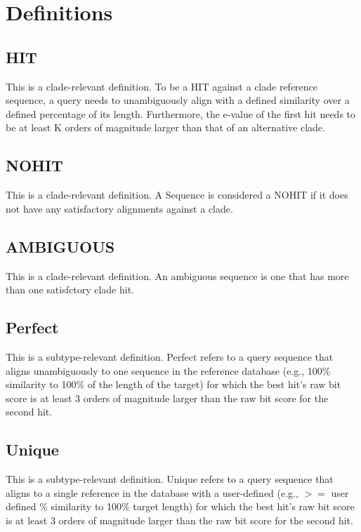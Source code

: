 \documentclass[letterpaper,10pt,english]{sphinxmanual}
\begin{document}
\section{Definitions}
\label{defs:definitions}

\subsection{HIT}
\label{defs:hits}\label{defs:hit}
This is a clade-relevant definition. To be a HIT against a clade reference sequence, a query needs to unambiguously align with a defined similarity over a defined percentage of its length.
Furthermore, the e-value of the first hit needs to be at least K orders of magnitude larger than that of an alternative clade.


\subsection{NOHIT}
\label{defs:nohits}\label{defs:nohit}
This is a clade-relevant definition. A Sequence is considered a NOHIT if it does not have any satisfactory alignments against a clade.


\subsection{AMBIGUOUS}
\label{defs:ambiguous}\label{defs:id1}
This is a clade-relevant definition. An ambiguous sequence is one that has more than one satisfctory clade hit.


\subsection{Perfect}
\label{defs:perfect}\label{defs:id2}
This is a subtype-relevant definition. Perfect refers to a query
sequence that aligns unambiguously to one sequence in the reference
database (e.g., 100\% similarity to 100\% of the length of the target)
for which the best hit's raw bit score is at least 3 orders of
magnitude larger than the raw bit score for the second hit.


\subsection{Unique}
\label{defs:unique}\label{defs:id3}
This is a subtype-relevant definition. Unique refers to a query sequence that aligns to a single reference in
the database with a user-defined (e.g., \(>=\) user defined \% similarity
to 100\% target length) for which the best hit's raw bit score is at
least 3 orders of magnitude larger than the raw bit score for the
second hit.
\end{document}
